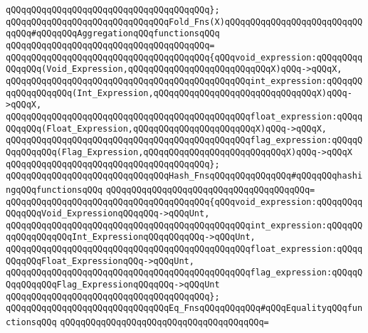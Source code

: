 \verb|qQQqqQQqqQQqqQQqqQQqqQQqqQQqqQQqqQQqqQQq};|\newline
\newline
\verb|qQQqqQQqqQQqqQQqqQQqqQQqqQQqqQQqFold_Fns(X)qQQqqQQqqQQqqQQqqQQqqQQqqQQqqQQq#qQQqqQQqAggregationqQQqfunctionsqQQq|\newline
\verb|qQQqqQQqqQQqqQQqqQQqqQQqqQQqqQQqqQQqqQQq=|\newline
\verb|qQQqqQQqqQQqqQQqqQQqqQQqqQQqqQQqqQQqqQQq{qQQqvoid_expression:qQQqqQQqqQQqqQQq(Void_Expression,qQQqqQQqqQQqqQQqqQQqqQQqqQQqX)qQQq->qQQqX,|\newline
\verb|qQQqqQQqqQQqqQQqqQQqqQQqqQQqqQQqqQQqqQQqqQQqqQQqint_expression:qQQqqQQqqQQqqQQqqQQq(Int_Expression,qQQqqQQqqQQqqQQqqQQqqQQqqQQqqQQqX)qQQq->qQQqX,|\newline
\verb|qQQqqQQqqQQqqQQqqQQqqQQqqQQqqQQqqQQqqQQqqQQqqQQqfloat_expression:qQQqqQQqqQQq(Float_Expression,qQQqqQQqqQQqqQQqqQQqqQQqX)qQQq->qQQqX,|\newline
\verb|qQQqqQQqqQQqqQQqqQQqqQQqqQQqqQQqqQQqqQQqqQQqqQQqflag_expression:qQQqqQQqqQQqqQQq(Flag_Expression,qQQqqQQqqQQqqQQqqQQqqQQqqQQqX)qQQq->qQQqX|\newline
\verb|qQQqqQQqqQQqqQQqqQQqqQQqqQQqqQQqqQQqqQQq};|\newline
\newline
\verb|qQQqqQQqqQQqqQQqqQQqqQQqqQQqqQQqHash_FnsqQQqqQQqqQQqqQQq#qQQqqQQqhashingqQQqfunctionsqQQq|\newline
\verb|qQQqqQQqqQQqqQQqqQQqqQQqqQQqqQQqqQQqqQQq=|\newline
\verb|qQQqqQQqqQQqqQQqqQQqqQQqqQQqqQQqqQQqqQQq{qQQqvoid_expression:qQQqqQQqqQQqqQQqVoid_ExpressionqQQqqQQq->qQQqUnt,|\newline
\verb|qQQqqQQqqQQqqQQqqQQqqQQqqQQqqQQqqQQqqQQqqQQqqQQqint_expression:qQQqqQQqqQQqqQQqqQQqInt_ExpressionqQQqqQQqqQQq->qQQqUnt,|\newline
\verb|qQQqqQQqqQQqqQQqqQQqqQQqqQQqqQQqqQQqqQQqqQQqqQQqfloat_expression:qQQqqQQqqQQqFloat_ExpressionqQQq->qQQqUnt,|\newline
\verb|qQQqqQQqqQQqqQQqqQQqqQQqqQQqqQQqqQQqqQQqqQQqqQQqflag_expression:qQQqqQQqqQQqqQQqFlag_ExpressionqQQqqQQq->qQQqUnt|\newline
\verb|qQQqqQQqqQQqqQQqqQQqqQQqqQQqqQQqqQQqqQQq};|\newline
\newline
\verb|qQQqqQQqqQQqqQQqqQQqqQQqqQQqqQQqEq_FnsqQQqqQQqqQQq#qQQqEqualityqQQqfunctionsqQQq|\newline
\verb|qQQqqQQqqQQqqQQqqQQqqQQqqQQqqQQqqQQqqQQq=|\newline

